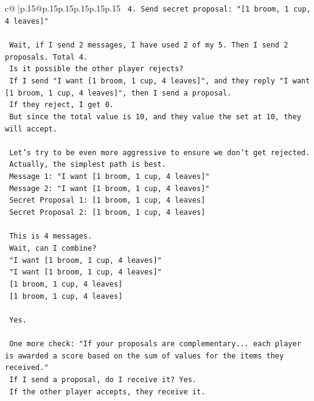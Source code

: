 \documentclass{article}
\begin{document}
{\begin{supertabular}{c@{$\;$}|p{.15\linewidth}@{}p{.15\linewidth}p{.15\linewidth}p{.15\linewidth}p{.15\linewidth}p{.15\linewidth}}
{{{\texttt{    4. Send secret proposal: "{[}1 broom, 1 cup, 4 leaves{]}"} \\
\\ 
\texttt{    Wait, if I send 2 messages, I have used 2 of my 5. Then I send 2 proposals. Total 4.} \\
\texttt{    Is it possible the other player rejects?} \\
\texttt{    If I send "I want {[}1 broom, 1 cup, 4 leaves{]}", and they reply "I want {[}1 broom, 1 cup, 4 leaves{]}", then I send a proposal.} \\
\texttt{    If they reject, I get 0.} \\
\texttt{    But since the total value is 10, and they value the set at 10, they will accept.} \\
\\ 
\texttt{    Let's try to be even more aggressive to ensure we don't get rejected.} \\
\texttt{    Actually, the simplest path is best.} \\
\texttt{    Message 1: "I want {[}1 broom, 1 cup, 4 leaves{]}"} \\
\texttt{    Message 2: "I want {[}1 broom, 1 cup, 4 leaves{]}"} \\
\texttt{    Secret Proposal 1: {[}1 broom, 1 cup, 4 leaves{]}} \\
\texttt{    Secret Proposal 2: {[}1 broom, 1 cup, 4 leaves{]}} \\
\\ 
\texttt{    This is 4 messages.} \\
\texttt{    Wait, can I combine?} \\
\texttt{    "I want {[}1 broom, 1 cup, 4 leaves{]}"} \\
\texttt{    "I want {[}1 broom, 1 cup, 4 leaves{]}"} \\
\texttt{    {[}1 broom, 1 cup, 4 leaves{]}} \\
\texttt{    {[}1 broom, 1 cup, 4 leaves{]}} \\
\\ 
\texttt{    Yes.} \\
\\ 
\texttt{    One more check: "If your proposals are complementary... each player is awarded a score based on the sum of values for the items they received."} \\
\texttt{    If I send a proposal, do I receive it? Yes.} \\
\texttt{    If the other player accepts, they receive it.} \\
}}}
\end{supertabular}}
\end{document}

